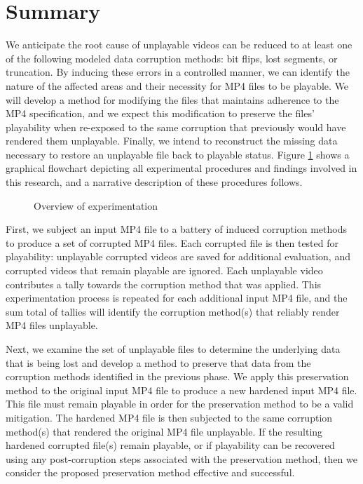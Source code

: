 \section{Summary}

We anticipate the root cause of unplayable videos can be reduced to at least one of the following modeled data corruption methods: bit flips, lost segments, or truncation. By inducing these errors in a controlled manner, we can identify the nature of the affected areas and their necessity for MP4 files to be playable. We will develop a method for modifying the files that maintains adherence to the MP4 specification, and we expect this modification to preserve the files' playability when re-exposed to the same corruption that previously would have rendered them unplayable. Finally, we intend to reconstruct the missing data necessary to restore an unplayable file back to playable status. Figure \ref{fig:experiment-flowchart} shows a graphical flowchart depicting all experimental procedures and findings involved in this research, and a narrative description of these procedures follows.

\begin{figure}[h!]
    \centering
    \def\svgwidth{0.65\columnwidth}
    
    \caption{Overview of experimentation}
    \label{fig:experiment-flowchart}
\end{figure}

First, we subject an input MP4 file to a battery of induced corruption methods to produce a set of corrupted MP4 files. Each corrupted file is then tested for playability: unplayable corrupted videos are saved for additional evaluation, and corrupted videos that remain playable are ignored. Each unplayable video contributes a tally towards the corruption method that was applied. This experimentation process is repeated for each additional input MP4 file, and the sum total of tallies will identify the corruption method(s) that reliably render MP4 files unplayable. 

Next, we examine the set of unplayable files to determine the underlying data that is being lost and develop a method to preserve that data from the corruption methods identified in the previous phase. We apply this preservation method to the original input MP4 file to produce a new hardened input MP4 file. This file must remain playable in order for the preservation method to be a valid mitigation. The hardened MP4 file is then subjected to the same corruption method(s) that rendered the original MP4 file unplayable. If the resulting hardened corrupted file(s) remain playable, or if playability can be recovered using any post-corruption steps associated with the preservation method, then we consider the proposed preservation method effective and successful.

